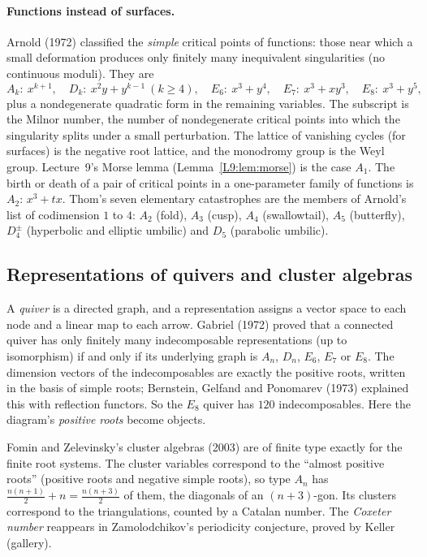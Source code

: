 \documentclass[11pt,openany]{book}
\theoremstyle{plain}
\theoremstyle{definition}
\theoremstyle{remark}
\begin{document}
\paragraph{Functions instead of surfaces.} Arnold (1972) classified the \emph{simple} critical points of
functions: those near which a small deformation produces only finitely many inequivalent singularities
(no continuous moduli). They are
\[
  A_k:\ x^{k+1},\quad D_k:\ x^2y+y^{k-1}\ (k\ge4),\quad E_6:\ x^3+y^4,\quad E_7:\ x^3+xy^3,\quad E_8:\ x^3+y^5,
\]
plus a nondegenerate quadratic form in the remaining variables. The subscript is the Milnor number, the
number of nondegenerate critical points into which the singularity splits under a small perturbation. The
lattice of vanishing cycles (for surfaces) is the negative root lattice, and the monodromy group is the
Weyl group. Lecture~9's Morse lemma (Lemma~\ref{L9:lem:morse}) is the case $A_1$. The birth or death of
a pair of critical points in a one-parameter family of functions is $A_2$: $x^3+tx$. Thom's seven elementary catastrophes are the members of Arnold's list of codimension $1$ to
$4$: $A_2$ (fold), $A_3$ (cusp), $A_4$ (swallowtail), $A_5$ (butterfly), $D_4^\pm$ (hyperbolic and elliptic
umbilic) and $D_5$ (parabolic umbilic).

\subsection*{Representations of quivers and cluster algebras}
A \emph{quiver} is a directed graph, and a representation assigns a vector space to each node and a
linear map to each arrow. Gabriel (1972) proved that a connected quiver has only finitely many
indecomposable representations (up to isomorphism) if and only if its underlying graph is $A_n$, $D_n$,
$E_6$, $E_7$ or $E_8$. The dimension vectors of the indecomposables are exactly the positive roots,
written in the basis of simple roots; Bernstein, Gelfand and Ponomarev (1973) explained this with
reflection functors. So the $E_8$ quiver has $120$ indecomposables. Here the diagram's
\emph{positive roots} become objects.

Fomin and Zelevinsky's cluster algebras (2003) are of finite type exactly for the finite root
systems. The cluster variables correspond to the ``almost positive roots'' (positive roots and negative
simple roots), so type $A_n$ has $\frac{n(n+1)}2+n=\frac{n(n+3)}2$ of them, the diagonals of an
$(n+3)$-gon. Its clusters correspond to the triangulations, counted by a Catalan number. The
\emph{Coxeter number} reappears in Zamolodchikov's periodicity conjecture, proved by Keller (gallery).
\end{document}
